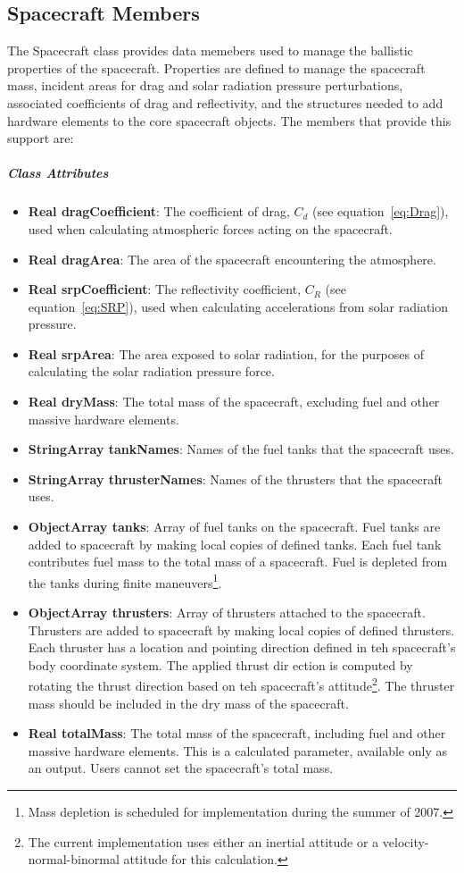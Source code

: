 \subsection{Spacecraft Members}

The Spacecraft class provides data memebers used to manage the ballistic properties of the
spacecraft.  Properties are defined to manage the spacecraft mass, incident areas for drag and
solar radiation pressure perturbations, associated coefficients of drag and reflectivity, and the
structures needed to add hardware elements to the core spacecraft objects.  The members that
provide this support are:

\subparagraph{\textit{Class Attributes}}

\begin{itemize}
\item \textbf{Real dragCoefficient}: The coefficient of drag, $C_d$ (see equation~\ref{eq:Drag}),
used when calculating atmospheric forces acting on the spacecraft.
\item \textbf{Real dragArea}:  The area of the spacecraft encountering the atmosphere.
\item \textbf{Real srpCoefficient}: The reflectivity coefficient, $C_R$ (see equation~\ref{eq:SRP}),
used when calculating accelerations from solar radiation pressure.
\item \textbf{Real srpArea}: The area exposed to solar radiation, for the purposes of calculating
the solar radiation pressure force.
\item \textbf{Real dryMass}: The total mass of the spacecraft, excluding fuel and other massive
hardware elements.
\item \textbf{StringArray tankNames}: Names of the fuel tanks that the spacecraft uses.
\item \textbf{StringArray thrusterNames}:  Names of the thrusters that the spacecraft uses.
\item \textbf{ObjectArray tanks}:  Array of fuel tanks on the spacecraft.  Fuel tanks are added to
spacecraft by making local copies of defined tanks.  Each fuel tank contributes fuel mass to the
total mass of a spacecraft.  Fuel is depleted from the tanks during finite maneuvers\footnote{Mass
depletion is scheduled for implementation during the summer of 2007.}.
\item \textbf{ObjectArray thrusters}:  Array of thrusters attached to the spacecraft.  Thrusters
are added to spacecraft by making local copies of defined thrusters.  Each thruster has a location
and pointing direction defined in teh spacecraft's body coordinate system.  The applied thrust dir
ection is computed by rotating the thrust direction based on teh spacecraft's
attitude\footnote{The current implementation uses either an inertial attitude or a
velocity-normal-binormal attitude for this calculation.}. The thruster mass should be included in
the dry mass of the spacecraft.
\item \textbf{Real totalMass}: The total mass of the spacecraft, including fuel and other massive
hardware elements.  This is a calculated parameter, available only as an output.  Users cannot set
the spacecraft's total mass.
\end{itemize}

